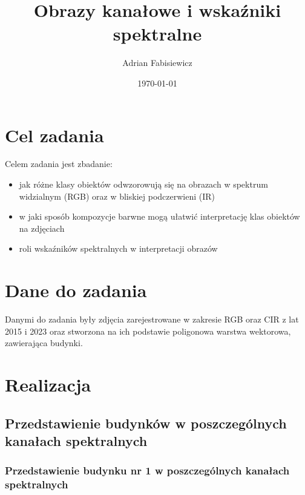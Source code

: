 \documentclass[a4paper,12pt]{article}  %
\title{Obrazy kanałowe i wskaźniki spektralne}
\author{Adrian Fabisiewicz}
\date{\today}
\begin{document}
\maketitle  %

\section{Cel zadania}
Celem zadania jest zbadanie:
\begin{itemize}
    \item jak różne klasy obiektów odwzorowują się na obrazach w spektrum widzialnym (RGB) oraz w bliskiej podczerwieni (IR) 
    \item w jaki sposób kompozycje barwne mogą ułatwić interpretację klas obiektów na zdjęciach
    \item roli wskaźników spektralnych w interpretacji obrazów
\end{itemize}

\section{Dane do zadania}
Danymi do zadania były zdjęcia zarejestrowane w zakresie RGB oraz CIR z lat 2015 i 2023 oraz stworzona na ich podstawie poligonowa warstwa wektorowa, zawierająca budynki.

\section{Realizacja}
\subsection{Przedstawienie budynków w poszczególnych kanałach spektralnych}

\subsubsection{Przedstawienie budynku nr 1 w poszczególnych kanałach spektralnych}
\end{document}
